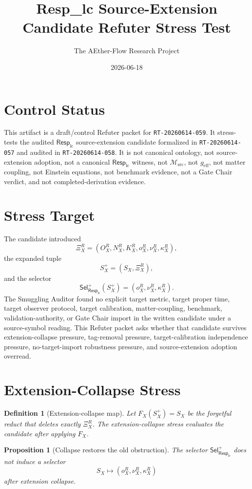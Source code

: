 \documentclass[11pt]{article}
\title{Resp\_lc Source-Extension Candidate Refuter Stress Test}
\author{The AEther-Flow Research Project}
\date{2026-06-18}
\newcommand{\RespLC}{\mathsf{Resp}_{\mathrm{lc}}}
\newcommand{\SelResp}{\mathsf{Sel}_{\RespLC}}
\newcommand{\Msrc}{\mathcal{M}_{\mathrm{src}}}
\newcommand{\geff}{g_{\mathrm{eff}}}
\newcommand{\XiR}{\Xi_X^R}
\newcommand{\SX}{S_X}
\newcommand{\Splus}{S_X^+}
\newtheorem{definition}{Definition}
\newtheorem{proposition}{Proposition}
\begin{document}
\maketitle

\section*{Control Status}

This artifact is a draft/control Refuter packet for
\texttt{RT-20260614-059}. It stress-tests the audited
\(\RespLC\) source-extension candidate formalized in
\texttt{RT-20260614-057} and audited in \texttt{RT-20260614-058}.
It is not canonical ontology, not source-extension adoption, not a
canonical \(\RespLC\) witness, not \(\Msrc\), not \(\geff\), not matter
coupling, not Einstein equations, not benchmark evidence, not a Gate
Chair verdict, and not completed-derivation evidence.

\section{Stress Target}

The candidate introduced
\[
  \XiR=(O_X^R,N_X^R,K_X^R,o_X^R,\nu_X^R,\kappa_X^R),
\]
the expanded tuple
\[
  \Splus=(\SX,\XiR),
\]
and the selector
\[
  \SelResp^{+}(\Splus)=(o_X^R,\nu_X^R,\kappa_X^R).
\]
The Smuggling Auditor found no explicit target metric, target proper
time, target observer protocol, target calibration, matter-coupling,
benchmark, validation-authority, or Gate Chair import in the written
candidate under a source-symbol reading. This Refuter packet asks
whether that candidate survives extension-collapse pressure, tag-removal
pressure, target-calibration independence pressure, no-target-import
robustness pressure, and source-extension adoption overread.

\section{Extension-Collapse Stress}

\begin{definition}[Extension-collapse map]
Let \(F_X(\Splus)=\SX\) be the forgetful reduct that deletes exactly
\(\XiR\). The extension-collapse stress evaluates the candidate after
applying \(F_X\).
\end{definition}

\begin{proposition}[Collapse restores the old obstruction]
The selector \(\SelResp^{+}\) does not induce a selector
\[
  \SX \mapsto (o_X^R,\nu_X^R,\kappa_X^R)
\]
after extension collapse.
\end{proposition}
\end{document}
